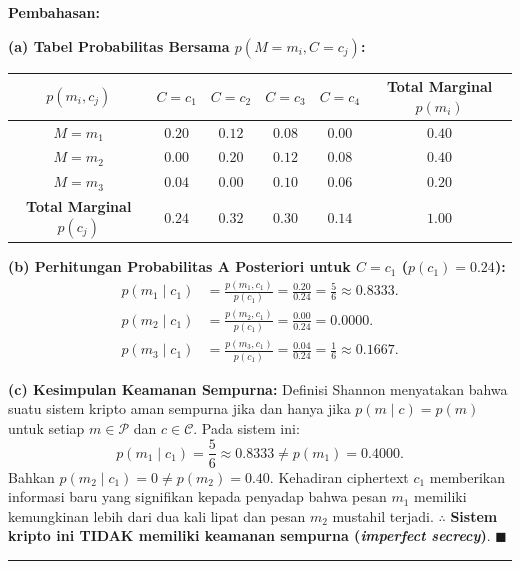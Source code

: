 \documentclass[11pt,a4paper]{article}
\newenvironment{solusi}{\noindent\textbf{\textsf{Pembahasan:}}\par\vspace{0.2em}}{\hfill$\blacksquare$\vspace{1em}\par\hrule\vspace{1em}}
\begin{document}
\begin{solusi}
\textbf{(a) Tabel Probabilitas Bersama $p(M = m_i, C = c_j)$:}
\begin{center}
\begin{tabular}{c | c c c c | c}
\toprule
$p(m_i, c_j)$ & $C = c_1$ & $C = c_2$ & $C = c_3$ & $C = c_4$ & \textbf{Total Marginal $p(m_i)$} \\
\midrule
$M = m_1$ & $0.20$ & $0.12$ & $0.08$ & $0.00$ & $\mathbf{0.40}$ \\
$M = m_2$ & $0.00$ & $0.20$ & $0.12$ & $0.08$ & $\mathbf{0.40}$ \\
$M = m_3$ & $0.04$ & $0.00$ & $0.10$ & $0.06$ & $\mathbf{0.20}$ \\
\midrule
\textbf{Total Marginal $p(c_j)$} & $\mathbf{0.24}$ & $\mathbf{0.32}$ & $\mathbf{0.30}$ & $\mathbf{0.14}$ & $\mathbf{1.00}$ \\
\bottomrule
\end{tabular}
\end{center}

\vspace{0.2cm}
\textbf{(b) Perhitungan Probabilitas A Posteriori untuk $C = c_1$ ($p(c_1) = 0.24$):}
\begin{align*}
p(m_1 \mid c_1) &= \frac{p(m_1, c_1)}{p(c_1)} = \frac{0.20}{0.24} = \frac{5}{6} \approx \mathbf{0.8333}. \\
p(m_2 \mid c_1) &= \frac{p(m_2, c_1)}{p(c_1)} = \frac{0.00}{0.24} = \mathbf{0.0000}. \\
p(m_3 \mid c_1) &= \frac{p(m_3, c_1)}{p(c_1)} = \frac{0.04}{0.24} = \frac{1}{6} \approx \mathbf{0.1667}.
\end{align*}

\vspace{0.2cm}
\textbf{(c) Kesimpulan Keamanan Sempurna:}
Definisi Shannon menyatakan bahwa suatu sistem kripto aman sempurna jika dan hanya jika $p(m \mid c) = p(m)$ untuk setiap $m \in \mathcal{P}$ dan $c \in \mathcal{C}$.
Pada sistem ini:
\[
p(m_1 \mid c_1) = \frac{5}{6} \approx 0.8333 \ne p(m_1) = 0.4000.
\]
Bahkan $p(m_2 \mid c_1) = 0 \ne p(m_2) = 0.40$. Kehadiran ciphertext $c_1$ memberikan informasi baru yang signifikan kepada penyadap bahwa pesan $m_1$ memiliki kemungkinan lebih dari dua kali lipat dan pesan $m_2$ mustahil terjadi.
$\therefore$ \textbf{Sistem kripto ini TIDAK memiliki keamanan sempurna (\textit{imperfect secrecy})}.
\end{solusi}

\end{document}
